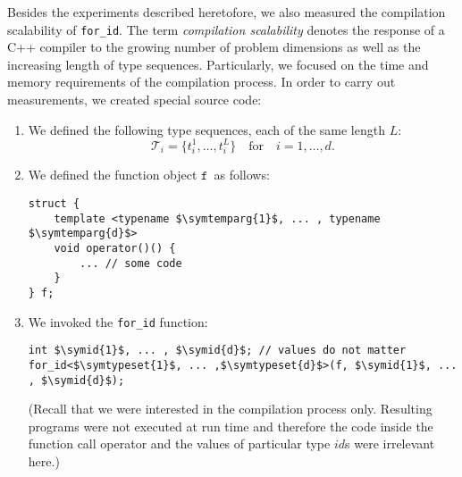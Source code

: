 \documentclass[10pt,a4paper]{article}
\theoremstyle{definition}\newtheorem{problem}{Problem}
\providecommand{\symtypeset}[1]{\ensuremath{\mathcal{T}_{#1}}}
\providecommand{\symtype}[2]{\ensuremath{t_{#1}^{#2}}}
\providecommand{\symtemparg}[1]{\ensuremath{t_{#1}}}
\providecommand{\symfunctor}{\ensuremath{\mathtt{f}}}
\providecommand{\symidb}{\ensuremath{\mathit{id}}}
\providecommand{\symid}[1]{\ensuremath{\symidb_{#1}}}
\providecommand{\forid}{\texttt{for\_id}\xspace}
\begin{document}
Besides the experiments described heretofore, we also measured the compilation scalability of \forid. The term \emph{compilation scalability} denotes the response of a C++ compiler to the growing number of problem dimensions as well as the increasing length of type sequences. Particularly, we focused on the time and memory requirements of the compilation process. In order to carry out measurements, we created special source code:
\begin{enumerate}
\item We defined the following type sequences, each of the same length $L$:  
\begin{displaymath}
\symtypeset{i}=\{\symtype{i}{1},\ldots,\symtype{i}{L}\}\quad\text{for}\quad i=1,\ldots,d.
\end{displaymath}

\item We defined the function object \symfunctor\ as follows:
\begin{lstlisting}
struct {
    template <typename $\symtemparg{1}$, ... , typename $\symtemparg{d}$>
    void operator()() {
        ... // some code
    }
} f;
\end{lstlisting}

\item We invoked the \forid function:
\begin{lstlisting}
int $\symid{1}$, ... , $\symid{d}$; // values do not matter
for_id<$\symtypeset{1}$, ... ,$\symtypeset{d}$>(f, $\symid{1}$, ... , $\symid{d}$);
\end{lstlisting}
(Recall that we were interested in the compilation process only. Resulting programs were not executed at run time and therefore the code inside the function call operator and the values of particular type \symidb s were irrelevant here.)

\end{enumerate}
\end{document}
